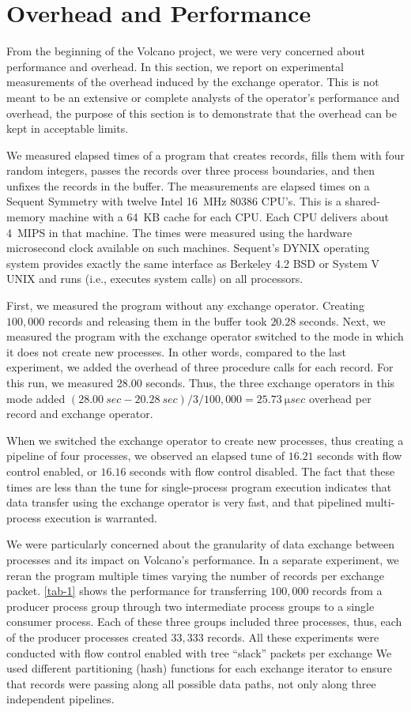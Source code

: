 \documentclass[a4paper,11pt,notitlepage,twoside,openright]{article}
\begin{document}
\section{Overhead and Performance}

From the beginning of the Volcano project, we were
very concerned about performance and overhead. In this
section, we report on experimental measurements of the
overhead induced by the exchange operator. This is not
meant to be an extensive or complete analysts of the
operator's performance and overhead, the purpose of this
section is to demonstrate that the overhead can be kept in
acceptable limits.

We measured elapsed times of a program that creates
records, fills them with four random integers, passes the
records over three process boundaries, and then unfixes the
records in the buffer. The measurements are elapsed times
on a Sequent Symmetry with twelve Intel \SI{16}{\mega\hertz} 80386
CPU's. This is a shared-memory machine with a \SI{64}{KB}
cache for each CPU. Each CPU delivers about \SI{4}{MIPS} in
that machine. The times were measured using the hardware
microsecond clock available on such machines. Sequent's
DYNIX operating system provides exactly the same interface
as Berkeley 4.2 BSD or System V UNIX and runs
(i.e., executes system calls) on all processors.

First, we measured the program without any exchange
operator. Creating $100,000$ records and releasing them in
the buffer took $20.28$ seconds. Next, we measured the program
with the exchange operator switched to the mode in
which it does not create new processes. In other words,
compared to the last experiment, we added the overhead of
three procedure calls for each record. For this run, we
measured $28.00$ seconds. Thus, the three exchange operators
in this mode added $(\SI{28.00}{sec} - \SI{20.28}{sec}) / 3 / 100,000
= \SI{25.73}{\micro sec}$ overhead per record and exchange operator.

When we switched the exchange operator to create
new processes, thus creating a pipeline of four processes,
we observed an elapsed tune of $16.21$ seconds with flow
control enabled, or $16.16$ seconds with flow control disabled.
The fact that these times are less than the tune for
single-process program execution indicates that data transfer
using the exchange operator is very fast, and that pipelined
multi-process execution is warranted.

We were particularly concerned about the granularity
of data exchange between processes and its impact on
Volcano's performance. In a separate experiment, we reran
the program multiple times varying the number of records
per exchange packet. \autoref{tab-1} shows the performance for
transferring $100,000$ records from a producer process group
through two intermediate process groups to a single
consumer process. Each of these three groups included
three processes, thus, each of the producer processes created
$33,333$ records. All these experiments were conducted with
flow control enabled with tree ``slack'' packets per
exchange We used different partitioning (hash) functions
for each exchange iterator to ensure that records were passing
along all possible data paths, not only along three
independent pipelines.
\end{document}
